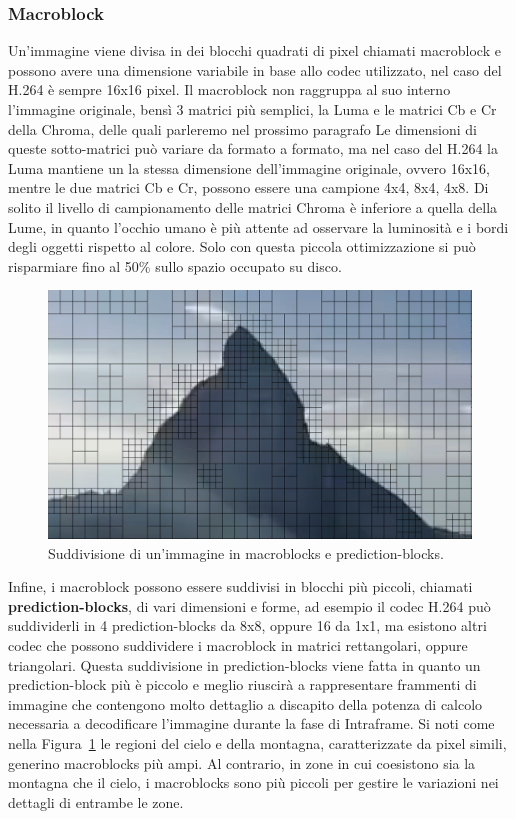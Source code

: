 \documentclass[a4paper,12pt, oneside]{article}
\begin{document}
\subsubsection{Macroblock}
Un'immagine viene divisa in dei blocchi quadrati di pixel chiamati macroblock e possono avere una
dimensione variabile in base allo codec utilizzato, nel caso del H.264 è sempre 16x16 pixel. Il
macroblock non raggruppa al suo interno l'immagine originale, bensì 3 matrici più semplici, la
Luma e le matrici Cb e Cr della Chroma, delle quali parleremo nel prossimo paragrafo Le dimensioni di
queste sotto-matrici può variare da
formato a formato, ma nel caso del H.264 la Luma mantiene un la stessa dimensione dell'immagine
originale, ovvero 16x16, mentre le due matrici Cb e Cr, possono essere una campione 4x4, 8x4, 4x8.
Di solito il livello di campionamento delle matrici Chroma è inferiore a quella della Lume, in quanto
l'occhio umano è più attente ad osservare la luminosità e i bordi degli oggetti rispetto al colore.
Solo con questa piccola ottimizzazione si può risparmiare fino al 50\% sullo spazio occupato su disco.

\begin{figure}[h]
    \centering
    \includegraphics[width=1\textwidth]{images/macroblocks_sub-division.png}
    \caption{Suddivisione di un'immagine in macroblocks e prediction-blocks.}
    \label{fig:macroblocks_sub_division}
\end{figure}

Infine, i macroblock possono essere suddivisi in blocchi più piccoli, chiamati
\textbf{prediction-blocks}, di vari dimensioni e forme, ad esempio il codec H.264 può suddividerli in
4 prediction-blocks da 8x8, oppure 16 da 1x1, ma esistono altri codec che possono suddividere i
macroblock in matrici rettangolari, oppure triangolari. Questa suddivisione in prediction-blocks
viene fatta in quanto un prediction-block più è piccolo e meglio riuscirà a rappresentare frammenti
di immagine che contengono molto dettaglio a discapito della potenza di calcolo necessaria a
decodificare l'immagine durante la fase di Intraframe. Si noti come nella
Figura~\ref{fig:macroblocks_sub_division} le regioni del cielo e della montagna, caratterizzate da
pixel simili, generino macroblocks più ampi. Al contrario, in zone in cui coesistono sia la montagna
che il cielo, i macroblocks sono più piccoli per gestire le variazioni nei dettagli di entrambe le
zone.
\end{document}
